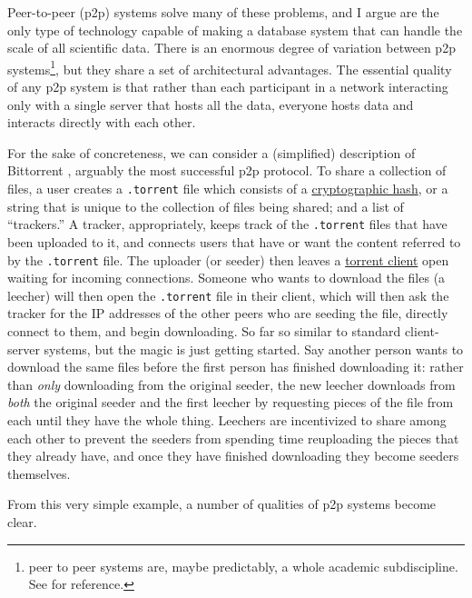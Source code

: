 \documentclass[10pt]{tufte-book}
\begin{document}
Peer-to-peer (p2p) systems solve many of these problems, and I argue are
the only type of technology capable of making a database system that can
handle the scale of all scientific data. There is an enormous degree of
variation between p2p systems\footnote{peer to peer systems are, maybe
  predictably, a whole academic subdiscipline. See \citep{shenHandbookPeertoPeerNetworking2010}  for reference.}, but they
share a set of architectural advantages. The essential quality of any
p2p system is that rather than each participant in a network interacting
only with a single server that hosts all the data, everyone hosts data
and interacts directly with each other.

For the sake of concreteness, we can consider a (simplified) description
of Bittorrent \citep{cohenBitTorrentProtocolSpecification2017} ,
arguably the most successful p2p protocol. To share a collection of
files, a user creates a \texttt{.torrent} file which consists of a
\href{https://en.wikipedia.org/wiki/Cryptographic_hash_function}{cryptographic
hash}, or a string that is unique to the collection of files being
shared; and a list of ``trackers.'' A tracker, appropriately, keeps
track of the \texttt{.torrent} files that have been uploaded to it, and
connects users that have or want the content referred to by the
\texttt{.torrent} file. The uploader (or seeder) then leaves a
\href{https://en.wikipedia.org/wiki/Glossary_of_BitTorrent_terms\#Client}{torrent
client} open waiting for incoming connections. Someone who wants to
download the files (a leecher) will then open the \texttt{.torrent} file
in their client, which will then ask the tracker for the IP addresses of
the other peers who are seeding the file, directly connect to them, and
begin downloading. So far so similar to standard client-server systems,
but the magic is just getting started. Say another person wants to
download the same files before the first person has finished downloading
it: rather than \emph{only} downloading from the original seeder, the
new leecher downloads from \emph{both} the original seeder and the first
leecher by requesting pieces of the file from each until they have the
whole thing. Leechers are incentivized to share among each other to
prevent the seeders from spending time reuploading the pieces that they
already have, and once they have finished downloading they become
seeders themselves.

From this very simple example, a number of qualities of p2p systems
become clear.
\end{document}
